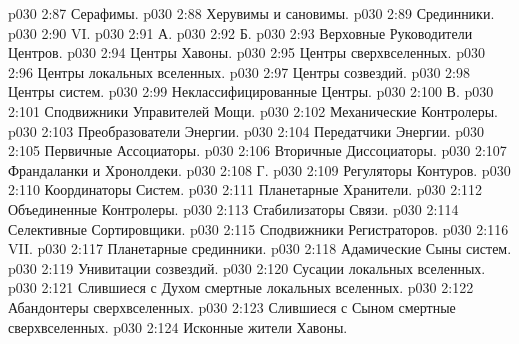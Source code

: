 \vs p030 2:87 \bibnobreakspace Серафимы.
\vs p030 2:88 \bibnobreakspace Херувимы и сановимы.
\vs p030 2:89 \bibnobreakspace Срединники.
\vs p030 2:90 \pc VI. 
\vs p030 2:91 \pc А. 
\vs p030 2:92 \pc Б. 
\vs p030 2:93 \bibnobreakspace Верховные Руководители Центров.
\vs p030 2:94 \bibnobreakspace Центры Хавоны.
\vs p030 2:95 \bibnobreakspace Центры сверхвселенных.
\vs p030 2:96 \bibnobreakspace Центры локальных вселенных.
\vs p030 2:97 \bibnobreakspace Центры созвездий.
\vs p030 2:98 \bibnobreakspace Центры систем.
\vs p030 2:99 \bibnobreakspace Неклассифицированные Центры.
\vs p030 2:100 \pc В. 
\vs p030 2:101 \bibnobreakspace Сподвижники Управителей Мощи.
\vs p030 2:102 \bibnobreakspace Механические Контролеры.
\vs p030 2:103 \bibnobreakspace Преобразователи Энергии.
\vs p030 2:104 \bibnobreakspace Передатчики Энергии.
\vs p030 2:105 \bibnobreakspace Первичные Ассоциаторы.
\vs p030 2:106 \bibnobreakspace Вторичные Диссоциаторы.
\vs p030 2:107 \bibnobreakspace Франдаланки и Хронолдеки.
\vs p030 2:108 \pc Г. 
\vs p030 2:109 \bibnobreakspace Регуляторы Контуров.
\vs p030 2:110 \bibnobreakspace Координаторы Систем.
\vs p030 2:111 \bibnobreakspace Планетарные Хранители.
\vs p030 2:112 \bibnobreakspace Объединенные Контролеры.
\vs p030 2:113 \bibnobreakspace Стабилизаторы Связи.
\vs p030 2:114 \bibnobreakspace Селективные Сортировщики.
\vs p030 2:115 \bibnobreakspace Сподвижники Регистраторов.
\vs p030 2:116 \pc VII. 
\vs p030 2:117 \bibnobreakspace Планетарные срединники.
\vs p030 2:118 \bibnobreakspace Адамические Сыны систем.
\vs p030 2:119 \bibnobreakspace Унивитации созвездий.
\vs p030 2:120 \bibnobreakspace Сусации локальных вселенных.
\vs p030 2:121 \bibnobreakspace Слившиеся с Духом смертные локальных вселенных.
\vs p030 2:122 \bibnobreakspace Абандонтеры сверхвселенных.
\vs p030 2:123 \bibnobreakspace Слившиеся с Сыном смертные сверхвселенных.
\vs p030 2:124 \bibnobreakspace Исконные жители Хавоны.

